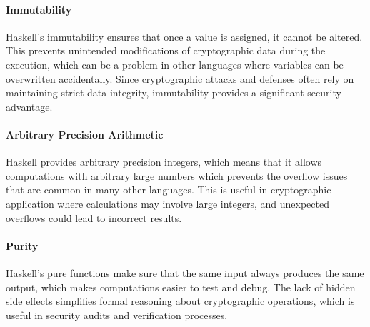\paragraph{Immutability}
Haskell's immutability ensures that once a value is assigned, it cannot be altered. 
This prevents unintended modifications of cryptographic data during the execution, 
which can be a problem in other languages where variables can be overwritten accidentally. 
Since cryptographic attacks and defenses often rely on maintaining strict data integrity, 
immutability provides a significant security advantage.

\paragraph{Arbitrary Precision Arithmetic}
Haskell provides arbitrary precision integers, 
which means that it allows computations with arbitrary large numbers which prevents the overflow issues that are common in many other languages. 
This is useful in cryptographic application where calculations may involve large integers, and unexpected overflows could lead to incorrect results.

\paragraph{Purity}
Haskell's pure functions make sure that the same input always produces the same output, 
which makes computations easier to test and debug. The lack of hidden side effects simplifies formal reasoning about cryptographic operations, 
which is useful in security audits and verification processes.

